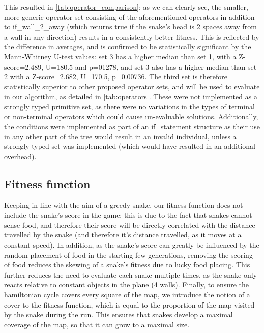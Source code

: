 \documentclass[british,10pt,a4paper]{article}
\begin{document}
This resulted in \autoref{tab:operator_comparison}: as we can clearly see, the smaller, more generic operator set consisting of the aforementioned operators in addition to if\_wall\_2\_away (which returns true if the snake's head is 2 spaces away from a wall in any direction) results in a consistently better fitness. This is reflected by the difference in averages, and is confirmed to be statistically significant by the Mann-Whitney U-test values: set 3 has a higher median than set 1, with a Z-score=2.489, U=180.5 and p=01278, and set 3 also has a higher median than set 2 with a Z-score=2.682, U=170.5, p=0.00736. The third set is therefore statistically superior to other proposed operator sets, and will be used to evaluate in our algorithm, as detailed in \autoref{tab:operators}. These were not implemented as a strongly typed primitive set, as there were no variations in the types of terminal or non-terminal operators which could cause un-evaluable solutions. Additionally, the conditions were implemented as part of an if\_statement structure as their use in any other part of the tree would result in an invalid individual, unless a strongly typed set was implemented (which would have resulted in an additional overhead).

\subsection{Fitness function}
\label{subsec:fitness_func}
Keeping in line with the aim of a greedy snake, our fitness function does not include the snake's score in the game; this is due to the fact that snakes cannot sense food, and therefore their score will be directly correlated with the distance travelled by the snake (and therefore it's distance travelled, as it moves at a constant speed). In addition, as the snake's score can greatly be influenced by the random placement of food in the starting few generations, removing the scoring of food reduces the skewing of a snake's fitness due to lucky food placing. This further reduces the need to evaluate each snake multiple times, as the snake only reacts relative to constant objects in the plane (4 walls). Finally, to ensure the hamiltonian cycle covers every square of the map, we introduce the notion of a cover to the fitness function, which is equal to the proportion of the map visited by the snake during the run. This ensures that snakes develop a maximal coverage of the map, so that it can grow to a maximal size. \newline
\end{document}

